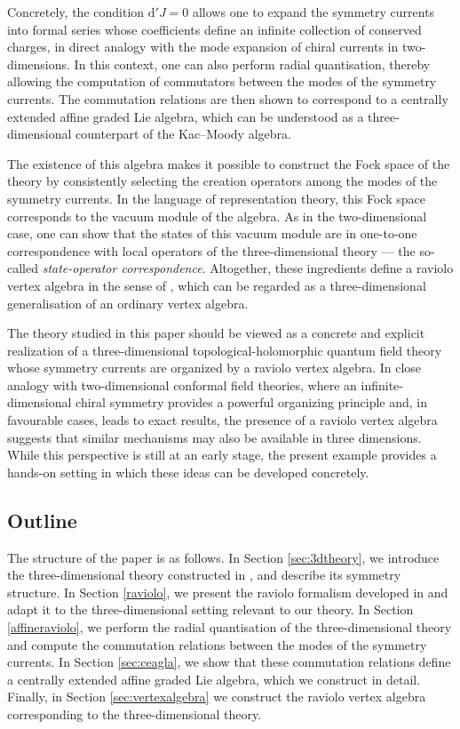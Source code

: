 \documentclass[11pt]{amsart}
\numberwithin{equation}{section}
\numberwithin{figure}{section}
\numberwithin{table}{section}
\renewcommand{\d}{\mathrm{d}}
\theoremstyle{thm}
\numberwithin{equation}{subsection}
\theoremstyle{definition}
\theoremstyle{rem}
\begin{document}
Concretely, the condition 
$\d'J=0$ allows one to expand the symmetry currents into formal series whose coefficients define an infinite collection of conserved charges, in direct analogy with the mode expansion of chiral currents in two-dimensions. In this context, one can also perform radial quantisation, thereby allowing the computation of commutators between the modes of the symmetry currents. The commutation relations are then shown to correspond to a centrally extended affine graded Lie algebra, which can be understood as a three-dimensional counterpart of the Kac–Moody algebra.

The existence of this algebra makes it possible to construct the Fock space of the theory by consistently selecting the creation operators among the modes of the symmetry currents. In the language of representation theory, this Fock space corresponds to the vacuum module of the algebra. As in the two-dimensional case, one can show that the states of this vacuum module are in one-to-one correspondence with local operators of the three-dimensional theory --- the so-called \textit{state-operator correspondence}.
Altogether, these ingredients define a raviolo vertex algebra in the sense of \cite{Garner:2023zqn}, which can be regarded as a three-dimensional generalisation of an ordinary vertex algebra.

The theory studied in this paper should be viewed as a concrete and explicit realization of a three-dimensional topological-holomorphic quantum field theory whose symmetry currents are organized by a raviolo vertex algebra. In close analogy with two-dimensional conformal field theories, where an infinite-dimensional chiral symmetry provides a powerful organizing principle and, in favourable cases, leads to exact results, the presence of a raviolo vertex algebra suggests that similar mechanisms may also be available in three dimensions. While this perspective is still at an early stage, the present example provides a hands-on setting in which these ideas can be developed concretely.


\subsection*{Outline}

The structure of the paper is as follows.
In Section \ref{sec:3dtheory}, we introduce the three-dimensional theory constructed in \cite{Chen:2024axr}, and describe its symmetry structure. In Section \ref{raviolo}, we present the raviolo formalism developed in \cite{Garner:2023zqn} and adapt it to the three-dimensional setting relevant to our theory. In Section \ref{affineraviolo}, we perform the radial quantisation of the three-dimensional theory and compute the commutation relations between the modes of the symmetry currents. In Section \ref{sec:ceagla}, we show that these commutation relations define a centrally extended affine graded Lie algebra, which we construct in detail. Finally, in Section \ref{sec:vertexalgebra} we construct the raviolo vertex algebra corresponding to the three-dimensional theory. 
\end{document}
